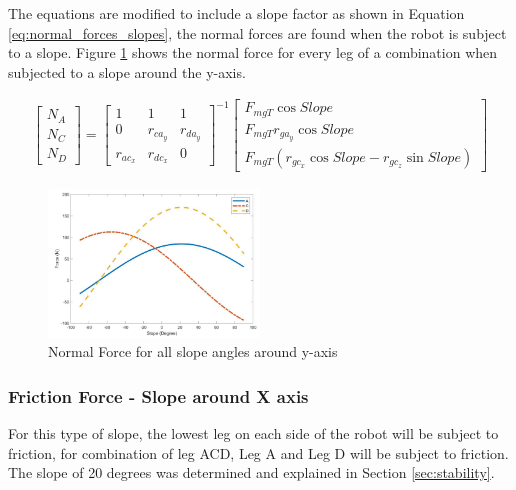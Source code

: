 The equations are modified to include a slope factor as shown in Equation \ref{eq:normal_forces_slopes}, the normal forces are found when the robot is subject to a slope. Figure \ref{fig:mod_force_slope} shows the normal force for every leg of a combination when subjected to a slope around the y-axis.

\begin{equation}
\begin{split}
    \left[ \begin{array}{ccc} 
    N_A 
    \\ 
   N_C
    \\ 
    N_D
    \end{array} \right]= \left[ \begin{array}{ccc} 
    1 & 1 & 1 
    \\ 
    0 & r_{ca_y} & r_{da_y} 
    \\ 
    r_{ac_x} & r_{dc_x} & 0
    \end{array} \right]^{-1}
    \left[ \begin{array}{ccc} 
    F_{mgT} \cos{Slope}
    \\ 
    F_{mgT} r_{ga_y} \cos{Slope}
    \\ 
    F_{mgT} (r_{gc_x}\cos{Slope} - r_{gc_z}\sin{Slope} )
    \end{array} \right] 
\end{split}\label{eq:normal_forces_slopes}
\end{equation} 


\begin{figure}
    \centering
    \includegraphics[width=0.5\textwidth]{3_SystemModelling/img/SlopeForces.PNG}
    \caption{Normal Force for all slope angles around y-axis}
    \label{fig:mod_force_slope}
\end{figure}

\subsubsection{Friction Force - Slope around X axis}
For this type of slope, the lowest leg on each side of the robot will be subject to friction, for combination of leg ACD, Leg A and Leg D will be subject to friction. The slope of 20 degrees was determined and explained in Section \ref{sec:stability}.

